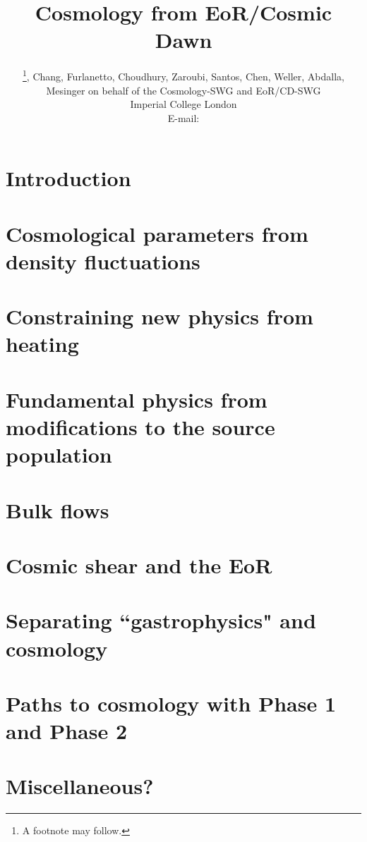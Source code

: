 \documentclass{PoS}
\title{Cosmology from EoR/Cosmic Dawn}
\author{\speaker{Pritchard}\thanks{A footnote may follow.}, Chang, Furlanetto, Choudhury, Zaroubi, Santos, Chen, Weller, Abdalla, Mesinger on behalf of the Cosmology-SWG and EoR/CD-SWG\\
        Imperial College London\\
        E-mail: \email{j.pritchard@imperial.ac.uk}}
\begin{document}
\section{Introduction}

\cite{furlanetto2006dm}

\section{Cosmological parameters from density fluctuations}

\section{Constraining new physics from heating}

\section{Fundamental physics from modifications to the source population}

\section{Bulk flows}

\section{Cosmic shear and the EoR}

\section{Separating ``gastrophysics" and cosmology}

\section{Paths to cosmology with Phase 1 and Phase 2}

\section{Miscellaneous?}



{}

\end{document}
